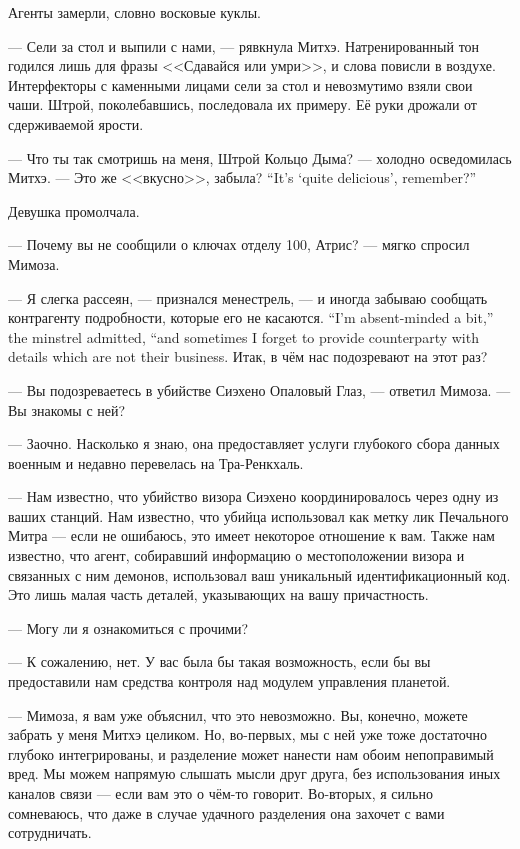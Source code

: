 Агенты замерли, словно восковые куклы.

--- Сели за стол и выпили с нами, --- рявкнула Митхэ.
Натренированный тон годился лишь для фразы <<Сдавайся или умри>>, и слова повисли в воздухе.
Интерфекторы с каменными лицами сели за стол и невозмутимо взяли свои чаши.
Штрой, поколебавшись, последовала их примеру.
Её руки дрожали от сдерживаемой ярости.

--- Что ты так смотришь на меня, Штрой Кольцо Дыма? --- холодно осведомилась Митхэ.
{--- Это же <<вкусно>>, забыла?}
{``It's `quite delicious', remember?''}

Девушка промолчала.

--- Почему вы не сообщили о ключах отделу 100, Атрис? --- мягко спросил Мимоза.

{--- Я слегка рассеян, --- признался менестрель, --- и иногда забываю сообщать контрагенту подробности, которые его не касаются.}
{``I'm absent-minded a bit,'' the minstrel admitted, ``and sometimes I forget to provide counterparty with details which are not their business.}
Итак, в чём нас подозревают на этот раз?

--- Вы подозреваетесь в убийстве Сиэхено Опаловый Глаз, --- ответил Мимоза.
--- Вы знакомы с ней?

--- Заочно.
Насколько я знаю, она предоставляет услуги глубокого сбора данных военным и недавно перевелась на Тра-Ренкхаль.

--- Нам известно, что убийство визора Сиэхено координировалось через одну из ваших станций.
Нам известно, что убийца использовал как метку лик Печального Митра --- если не ошибаюсь, это имеет некоторое отношение к вам.
Также нам известно, что агент, собиравший информацию о местоположении визора и связанных с ним демонов, использовал ваш уникальный идентификационный код.
Это лишь малая часть деталей, указывающих на вашу причастность.

--- Могу ли я ознакомиться с прочими?

--- К сожалению, нет.
У вас была бы такая возможность, если бы вы предоставили нам средства контроля над модулем управления планетой.

--- Мимоза, я вам уже объяснил, что это невозможно.
Вы, конечно, можете забрать у меня Митхэ целиком.
Но, во-первых, мы с ней уже тоже достаточно глубоко интегрированы, и разделение может нанести нам обоим непоправимый вред.
Мы можем напрямую слышать мысли друг друга, без использования иных каналов связи --- если вам это о чём-то говорит.
Во-вторых, я сильно сомневаюсь, что даже в случае удачного разделения она захочет с вами сотрудничать.

